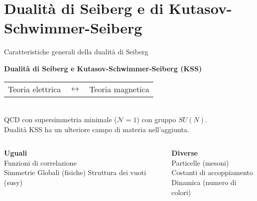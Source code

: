 \documentclass[10pt,compress,usenames,dvipsnames]{beamer}
\begin{document}
\section{Dualità di Seiberg e di Kutasov-Schwimmer-Seiberg}



\begin{frame}{Caratteristiche generali della dualità di Seiberg}
\begin{center}
 \begin{center}
 {\bfseries \Large Dualità di Seiberg e Kutasov-Schwimmer-Seiberg (KSS)} \\[0,4cm]
\end{center}
\begin{tabular}{r c l }
{ \large Teoria elettrica } & $\longleftrightarrow$ & {\large Teoria magnetica}
\end{tabular}
\\[0,2cm]

{ 
	QCD con supersimmetria minimale ($\mathcal{N}=1$) con gruppo $SU(N)$.\\
	Dualità KSS ha un ulteriore campo di materia nell'aggiunta.  
}
%
\end{center}
\begin{columns}[c]
	\begin{column}{0.5 \textwidth}			
		\begin{center}
		{\bfseries Uguali} \\
		Funzioni di correlazione \\
		Simmetrie Globali (\alert{fisiche})
		Struttura dei vuoti (\alert{susy})
		\vspace{0,3cm}
		\end{center}
	\end{column}

	\begin{column}{0.5 \textwidth}
\vspace{-0,3cm}
		\begin{center}
		{\bfseries Diverse}\\
		Particelle (\alert{mesoni})\\
		Costanti di accoppiamento \\
		Dinamica (\alert{numero di colori})\\
		\end{center}
	\end{column}
\end{columns}
\begin{center}
\end{center}
\end{frame}
\end{document}
